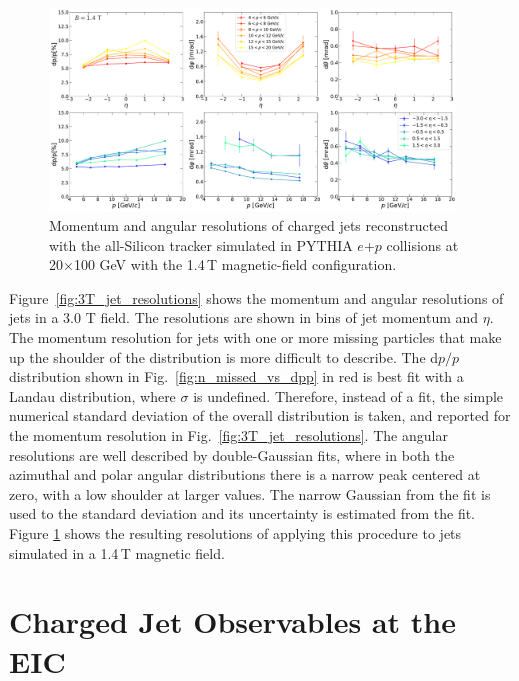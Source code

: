 \begin{figure}[htbp]
    \centering
    \includegraphics[width=0.96\textwidth]{EIC_Jets/DeltaR_B_1.4_resolutions_eta_mom.pdf}
    \caption{Momentum and angular resolutions of charged jets reconstructed with the all-Silicon tracker simulated in PYTHIA $e$+$p$ collisions at 20$\times$100 GeV with the 1.4\,T magnetic-field configuration.}
    \label{fig:1p4T_jet_resolutions}
\end{figure}

Figure~\ref{fig:3T_jet_resolutions} shows the momentum and angular resolutions of jets in a 3.0 T field. The resolutions are shown in bins of jet momentum and $\eta$. The momentum resolution for jets with one or more missing particles that make up the shoulder of the distribution is more difficult to describe. The d$p/p$ distribution shown in Fig.~\ref{fig:n_missed_vs_dpp} in red is best fit with a Landau distribution, where $\sigma$ is undefined. Therefore, instead of a fit, the simple numerical standard deviation of the overall distribution is taken, and reported for the momentum resolution in Fig.~\ref{fig:3T_jet_resolutions}. The angular resolutions are well described by double-Gaussian fits, where in both the azimuthal and polar angular distributions there is  a narrow peak centered at zero, with a low shoulder at larger values. The narrow Gaussian from the fit  is used to the standard deviation and its uncertainty is estimated from the fit. Figure \ref{fig:1p4T_jet_resolutions} shows the resulting resolutions of applying this procedure to jets simulated in a 1.4\,T magnetic field.


\section{Charged Jet Observables at the EIC}

